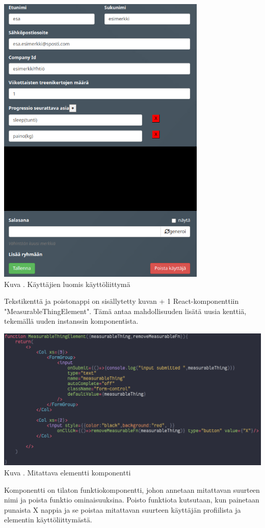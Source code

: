 \bigskip
\includegraphics[width = 10cm]{src/public/oppar/adminUserProfilePostcencoredroles.png}\\
Kuva \getImgCount {}. Käyttäjien luomis käyttöliittymä 
\bigskip

Tekstikenttä ja poistonappi on sisällytetty kuvan {\the\numexpr \theimgCounter + 1 } React-komponenttiin "MeasurableThingElement". 
Tämä antaa mahdollisuuden lisätä uusia kenttiä, tekemällä uuden instanssin komponentista.

\includegraphics[width = 15cm]{src/public/oppar/measurableElementComponent.png}\\
Kuva \getImgCount {}. Mitattava elementti komponentti
\medskip

Komponentti on tilaton funktiokomponentti, johon annetaan mitattavan suurteen nimi ja poista funktio ominaisuuksina.
Poisto funktiota kutsutaan, kun painetaan punaista X nappia ja se poistaa mitattavan suurteen käyttäjän profiilista ja elementin käyttöliittymästä.
\medskip












